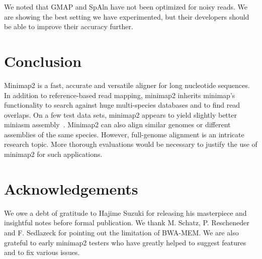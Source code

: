 \documentclass{bioinfo}
\begin{document}
We noted that GMAP and SpAln have not been optimized for noisy reads. We are
showing the best setting we have experimented, but their developers should be
able to improve their accuracy further.



\section{Conclusion}

Minimap2 is a fast, accurate and versatile aligner for long nucleotide
sequences.  In addition to reference-based read mapping, minimap2 inherits
minimap's functionality to search against huge multi-species databases and to
find read overlaps. On a few test data sets, minimap2 appears to yield slightly
better miniasm assembly~\citep{Li:2016aa}. Minimap2 can also align similar
genomes or different assemblies of the same species. However, full-genome
alignment is an intricate research topic. More thorough evaluations would be
necessary to justify the use of minimap2 for such applications.

\section*{Acknowledgements}
We owe a debt of gratitude to Hajime Suzuki for releasing his masterpiece and
insightful notes before formal publication. We thank M. Schatz, P. Rescheneder
and F.  Sedlazeck for pointing out the limitation of BWA-MEM. We are also
grateful to early minimap2 testers who have greatly helped to suggest features
and to fix various issues.


\end{document}
